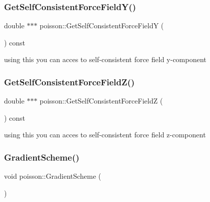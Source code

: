 \mbox{\label{classpoisson_abab1829dc556d57c2a156b6954dcc219}} 
\subsubsection{\texorpdfstring{Get\+Self\+Consistent\+Force\+Field\+Y()}{GetSelfConsistentForceFieldY()}}
{\footnotesize\ttfamily double $\ast$$\ast$$\ast$ poisson\+::\+Get\+Self\+Consistent\+Force\+FieldY (\begin{DoxyParamCaption}{ }\end{DoxyParamCaption}) const}



using this you can acces to self-\/consistent force field y-\/component 

\mbox{\label{classpoisson_ac0891df30c3686bc0d8bef48cade2b62}} 
\subsubsection{\texorpdfstring{Get\+Self\+Consistent\+Force\+Field\+Z()}{GetSelfConsistentForceFieldZ()}}
{\footnotesize\ttfamily double $\ast$$\ast$$\ast$ poisson\+::\+Get\+Self\+Consistent\+Force\+FieldZ (\begin{DoxyParamCaption}{ }\end{DoxyParamCaption}) const}



using this you can acces to self-\/consistent force field z-\/component 

\mbox{\label{classpoisson_ab99b96968796501b381426609037c6b8}} 
\subsubsection{\texorpdfstring{Gradient\+Scheme()}{GradientScheme()}}
{\footnotesize\ttfamily void poisson\+::\+Gradient\+Scheme (\begin{DoxyParamCaption}{ }\end{DoxyParamCaption})}



